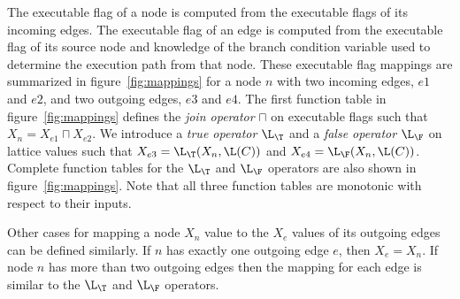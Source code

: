 
The executable flag of a node is computed from the executable flags
of its incoming edges. The executable flag of an edge is computed from
the executable flag of its source node and knowledge of the branch condition
variable used to determine the execution path from that node.
These executable flag mappings are summarized in figure~\ref{fig:mappings}
for  a node $n$ with two incoming edges, $e1$ and $e2$, and two 
outgoing edges, $e3$ and $e4$. The first
function table in figure~\ref{fig:mappings} defines
the {\it join operator}
$\sqcap$ on executable flags
such that $X_n = X_{e1} \sqcap X_{e2}$.  We 
introduce a {\it true operator}
$\L_{\T}$ and a {\it false operator} $\L_{\F}$ on lattice values
such that $X_{e3} = \L_{\T}(X_n,\L(C))$
and $X_{e4} = \L_{\F}(X_n,\L(C))$.  Complete function tables for the $\L_{\T}$ and
$\L_{\F}$ operators are also shown in figure~\ref{fig:mappings}.
Note that all three function tables are monotonic with respect to
their inputs.


Other cases for mapping a node $X_n$ value to the $X_e$ values of its
outgoing edges can be defined similarly.  If $n$ has exactly one
outgoing edge $e$, then $X_e = X_n$.  If node $n$ has more than two outgoing edges
then the mapping for each edge is similar to the $\L_{\T}$ and $\L_{\F}$
operators.



